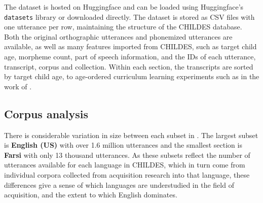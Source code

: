 The dataset is hosted on Huggingface and can be loaded using Huggingface's \texttt{datasets} library \citep{lhoest-etal-2021-datasets} or downloaded directly. The dataset is stored as CSV files with one utterance per row, maintaining the structure of the CHILDES database. Both the original orthographic utterances and phonemized utterances are available, as well as many features imported from CHILDES, such as target child age, morpheme count, part of speech information, and the IDs of each utterance, transcript, corpus and collection. Within each section, the transcripts are sorted by target child age, to age-ordered curriculum learning experiments such as in the work of \citet{huebner-etal-2021-babyberta}. 

\subsection{Corpus analysis}
\label{sec:dataset-phonemized-childes-analysis}

There is considerable variation in size between each subset in \ipachildes. The largest subset is \textbf{English (US)} with over 1.6 million utterances and the smallest section is \textbf{Farsi} with only 13 thousand utterances. As these subsets reflect the number of utterances available for each language in CHILDES, which in turn come from individual corpora collected from acquisition research into that language, these differences give a sense of which languages are understudied in the field of acquisition, and the extent to which English dominates.







